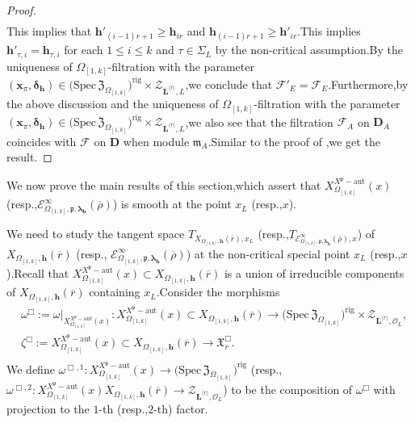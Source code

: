 \documentclass[SecEq,CM,GP]{degruyter-crelle} %
\theoremstyle{plain}
\newcommand{\bersteineigenvarpik}{{\mathcal{E}_{\omepik,\fp,\bm{\lambda}_\bh}^\infty(\overline{\rho})}}
\newcommand{\Dpik}{{\mathbf{D}}}
\newcommand{\defvarrho}{{ X_{\omepik,\mathbf{{h}}}(\overline{r})}}
\newcommand{\hpi}{{{\mathbf{h}}}}
\newcommand{\lrr}{{\langle r\rangle}}
\newcommand{\omepik}{\Omega_{[1,k]}}
\newcommand{\rigch}{{\mathcal{Z}_{\bL^{\lrr},\mathcal{O}_L}}}
\newcommand{\rigchl}{{\mathcal{Z}_{\bL^{\lrr},L}}}
\newcommand{\sbanpik}{{\big(\mathrm{Spec}\hspace{2pt}\mathfrak{Z}_{\omepik}\big)^{\mathrm{rig}}}}
\newcommand{\xfpx}{X^{X^\fp-\mathrm{aut}}_{\omepik}(x)}
\newcommand{\bL}{{\mathbf{L}}}
\newcommand{\bx}{{\mathbf{x}}}
\newcommand{\bh}{{\mathbf{h}}}
\newcommand{\cF}{\mathcal F}
\newcommand{\fm}{{\mathfrak{m}}}
\newcommand{\fp}{{\mathfrak{p}}}
\begin{document}
\begin{proof}
\begin{equation}
\begin{aligned}
	\end{aligned}
\end{equation}
This implies that $\hpi'_{(i-1)r+1}\geq \hpi_{ir}$ and $\hpi_{(i-1)r+1}\geq \hpi'_{ir}$.\;This implies $\hpi'_{\tau,i}=\hpi_{\tau,i}$ for each $1\leq i\leq k$ and $\tau\in \Sigma_{L}$ by the  non-critical assumption.\;By the uniqueness of $\omepik$-filtration with the parameter $(\bx_{\pi},\bm{\delta}_{\bh})\in \sbanpik\times\rigchl$,\;we conclude that $\cF'_{E}=\cF_{E}$.\;Furthermore,\;by the above discussion and  the uniqueness of $\omepik$-filtration with the parameter $(\bx_{\pi},\bm{\delta}_{\bh})\in \sbanpik\times\rigchl$,\;we also see that the filtration $\cF_{A}$ on $\Dpik_A$ coincides with $\cF$ on $\Dpik$ when module $\fm_A$.\;Similar to the proof of \cite[Lemma 2.2.3]{AST2009324R10},\;we get the result.\;	%
\end{proof}


We now prove the main results of this section,\;which assert that $\xfpx$ (resp.,\;$\bersteineigenvarpik$) is smooth at the point $x_L$ (resp.,\;$x$).\;


We need to study the tangent space $T_{\defvarrho,x_L}$ (resp.,\;$T_{\bersteineigenvarpik,x}$) of  $\defvarrho$ (resp., $\bersteineigenvarpik$) at the non-critical special point $x_L$ (resp.,\;$x$).\;Recall that $ \xfpx\subset \defvarrho$ is a union of  irreducible components of $\defvarrho$ containing $x_L$.\;Consider the morphisms
\begin{equation}\label{variousmorphisms}
\begin{aligned}
	&\omega^{\Box}:=\omega|_{\xfpx}:	\xfpx\subset \defvarrho \longrightarrow \sbanpik\times\rigch,\\
	&\zeta^{\Box}:=\xfpx\subset \defvarrho \longrightarrow {\mathfrak{X}_{\overline{r}}^\Box}.\\
\end{aligned}
\end{equation}
We define $\omega^{\Box,1}:\xfpx\longrightarrow \sbanpik$ (resp.,\;$\omega^{\Box,2}:\xfpx\defvarrho \longrightarrow \rigch$) to be the composition of $\omega^{\Box}$ with projection to the $1$-th (resp.,\;$2$-th) factor.\;
\end{document}
